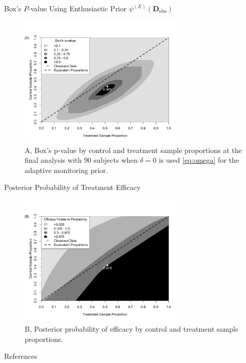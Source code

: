 \documentclass{beamer}
\begin{document}
\begin{frame}{Box's $P$-value Using Enthusiastic Prior $\psi^{(E)}(\mathbf{D}_{\text{obs}})$ }
\begin{figure}[htbp]
\begin{center}
\includegraphics[width=0.7\textwidth]{./figures/2dbayesp.png}
    \caption{A, Box's p-value by control and treatment sample proportions at the final analysis with 90 subjects when $\delta=0$ is used \eqref{eq:omega} for the adaptive monitoring prior.}
\label{fig:2dheatmaps}
 \end{center}
\end{figure}
\end{frame}

\begin{frame}{Posterior Probability of Treatment Efficacy}
\begin{figure}[htbp]
\begin{center}
\includegraphics[width=0.7\textwidth]{./figures/2dpostp.png}
    \caption{B, Posterior probability of efficacy by control and treatment sample proportions.}
\label{fig:2dheatmaps}
 \end{center}
\end{figure}
\end{frame}





%

\begin{frame}{References}
% 

	
%
\end{frame}
\end{document}
